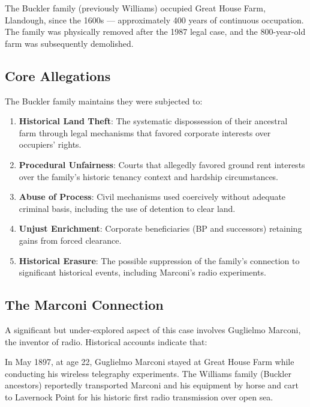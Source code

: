 \documentclass[11pt,a4paper]{article}
\begin{document}
\begin{keyfact}
The Buckler family (previously Williams) occupied Great House Farm, Llandough, since the 1600s --- approximately 400 years of continuous occupation. The family was physically removed after the 1987 legal case, and the 800-year-old farm was subsequently demolished.
\end{keyfact}

\subsection{Core Allegations}

The Buckler family maintains they were subjected to:

\begin{enumerate}[label=\arabic*.]
    \item \textbf{Historical Land Theft}: The systematic dispossession of their ancestral farm through legal mechanisms that favored corporate interests over occupiers' rights.
    \item \textbf{Procedural Unfairness}: Courts that allegedly favored ground rent interests over the family's historic tenancy context and hardship circumstances.
    \item \textbf{Abuse of Process}: Civil mechanisms used coercively without adequate criminal basis, including the use of detention to clear land.
    \item \textbf{Unjust Enrichment}: Corporate beneficiaries (BP and successors) retaining gains from forced clearance.
    \item \textbf{Historical Erasure}: The possible suppression of the family's connection to significant historical events, including Marconi's radio experiments.
\end{enumerate}

\subsection{The Marconi Connection}

A significant but under-explored aspect of this case involves Guglielmo Marconi, the inventor of radio. Historical accounts indicate that:

\begin{timeline}
In May 1897, at age 22, Guglielmo Marconi stayed at Great House Farm while conducting his wireless telegraphy experiments. The Williams family (Buckler ancestors) reportedly transported Marconi and his equipment by horse and cart to Lavernock Point for his historic first radio transmission over open sea.
\end{timeline}
\end{document}

